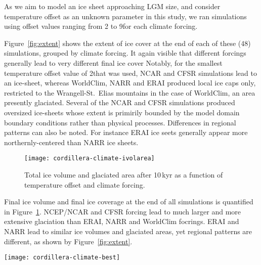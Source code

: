 As we aim to model an ice sheet approaching LGM size, and consider temperature offset as an unknown parameter in this study, we ran simulations using offset values ranging from 2 to 9\degC for each climate forcing.

Figure~\ref{fig:extent} shows the extent of ice cover at the end of each of these (48) simulations, grouped by climate forcing. It again visible that different forcings generally lead to very different final ice cover Notably, for the smallest temperature offset value of 2\degC that was used, NCAR and CFSR simulations lead to an ice-sheet, whereas WorldClim, NARR and ERAI produced local ice caps only, restricted to the Wrangell-St.~Elias mountains in the case of WorldClim, an area presently glaciated. Several of the NCAR and CFSR simulations produced oversized ice-sheets whose extent is primirily bounded by the model domain boundary conditions rather than physical processes. Differences in regional patterns can also be noted. For instance ERAI ice seets generally appear more northernly-centered than NARR ice sheets.

\begin{figure}[t]
	\vspace*{2mm}
	\begin{center}
		\texttt{[image: cordillera-climate-ivolarea]}
	\end{center}
	\caption{Total ice volume and glaciated area after 10\,kyr as a function of temperature offset and climate forcing.}
	\label{fig:ivolarea}
\end{figure}

Final ice volume and final ice coverage at the end of all simulations is quantified in Figure~\ref{fig:ivolarea}. NCEP/NCAR and CFSR forcing lead to much larger and more extensive glaciation than ERAI, NARR and WorldClim focrings. ERAI and NARR lead to similar ice volumes and glaciated areas, yet regional patterns are different, as shown by Figure~\ref{fig:extent}.

\begin{figure*}[t]
	\vspace*{2mm}
	\begin{center}
		\texttt{[image: cordillera-climate-best]}
	\end{center}
	\caption{Ice surface topography (black contours every 1000\,m) and velocity (\unit{m\,yr^{-1}}) after 10\,kyr using temperature offsets that lead to similar areas of ice cover for each climate forcing.}
	\label{fig:best}
\end{figure*}


